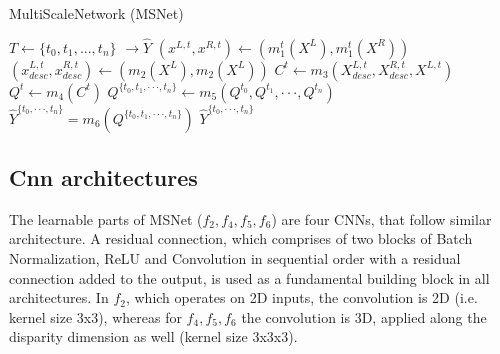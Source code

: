 \documentclass[runningheads]{llncs}
\begin{document}
\begin{algorithm}
\caption{MultiScaleNetwork (MSNet)}\label{alg:MSNET}
\begin{algorithmic}[1]
\State $T \gets \{ t_0, t_1, ... , t_n\}$ 
 $\rightarrow \hat{Y}$ 
\State $(x^{L,t},  x^{R,t}) \gets (m_1^t(X^L),m_1^t(X^R)) $ 
\State $(x^{L,t}_{desc}, x^{R,t}_{desc}) \gets (m_2(X^L), m_2(X^L))$ 
\State $C^{t} \gets m_3(X^{L,t}_{desc}, X^{R,t}_{desc}, X^{L,t})$ 
\State $Q^{t} \gets m_4(C^{t})$ 
\EndFor
\State $Q^{\{t_0, t_1, \cdot \cdot \cdot, t_n\}} \gets m_5(Q^{t_0}, Q^{t_1}, \cdot \cdot \cdot, Q^{t_n})$ 
\State $\hat{Y}^{\{ t_0, \cdot \cdot \cdot, t_n \}} = m_6(Q^{\{t_0, t_1, \cdot \cdot \cdot, t_n\}}) $ 
\State \Return $\hat{Y}^{\{ t_0, \cdot \cdot \cdot, t_n \}} $
\EndProcedure
\end{algorithmic}
\end{algorithm}

\subsection*{Cnn architectures}

The learnable parts of MSNet ($f_2, f_4, f_5, f_6$) are four CNNs, that follow similar architecture. A residual connection, which comprises of two blocks of Batch Normalization, ReLU and Convolution in sequential order with a residual connection added to the output, is used as a fundamental building block in all architectures. In $f_2$, which operates on 2D inputs, the convolution is 2D (i.e. kernel size 3x3), whereas for $f_4, f_5, f_6$ the convolution is 3D, applied along the disparity dimension as well (kernel size 3x3x3).
\end{document}
